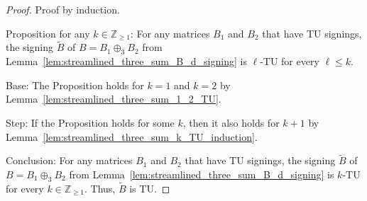 \documentclass{article}
\theoremstyle{definition}
\begin{document}
\begin{proof}
    Proof by induction.

    Proposition for any $k \in \mathbb{Z}_{\geq 1}$: For any matrices $B_{1}$ and $B_{2}$ that have TU signings, the signing $\tilde{B}$ of $B = B_{1} \oplus_{3} B_{2}$ from Lemma~\ref{lem:streamlined_three_sum_B_d_signing} is $\ell$-TU for every $\ell \leq k$.

    Base: The Proposition holds for $k = 1$ and $k = 2$ by Lemma~\ref{lem:streamlined_three_sum_1_2_TU}.

    Step: If the Proposition holds for some $k$, then it also holds for $k + 1$ by Lemma~\ref{lem:streamlined_three_sum_k_TU_induction}.

    Conclusion: For any matrices $B_{1}$ and $B_{2}$ that have TU signings, the signing $\tilde{B}$ of $B = B_{1} \oplus_{3} B_{2}$ from Lemma~\ref{lem:streamlined_three_sum_B_d_signing} is $k$-TU for every $k \in \mathbb{Z}_{\geq 1}$. Thus, $\tilde{B}$ is TU.
\end{proof}
\end{document}
